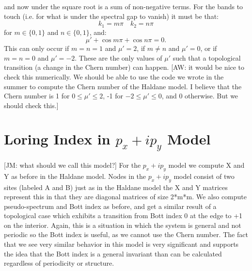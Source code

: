 \documentclass[a4paper]{article}
\newcommand{\aw}[1]{{\color{blue} [AW: #1]}}
\newcommand{\jm}[1]{{\color{red} [JM: #1]}}
\begin{document}
and now under the square root is a sum of non-negative terms. For the bands to touch (i.e. for what is under the spectral gap to vanish) it must be that:
\begin{equation}
	k_1 = m \pi \quad k_2 = n \pi
\end{equation}
for $m \in \{0,1\}$ and $n \in \{0,1\}$, and:
\begin{equation}
	\mu' + \cos m \pi + \cos n \pi = 0.
\end{equation}
This can only occur if $m = n = 1$ and $\mu' = 2$, if $m \neq n$ and $\mu' = 0$, or if $m = n = 0$ and $\mu' = - 2$. These are the only values of $\mu'$ such that a topological transition (a change in the Chern number) can happen. \aw{it would be nice to check this numerically. We should be able to use the code we wrote in the summer to compute the Chern number of the Haldane model. I believe that the Chern number is 1 for $0 \leq \mu' \leq 2$, -1 for $- 2 \leq \mu' \leq 0$, and 0 otherwise. But we should check this.}

\section{Loring Index in \texorpdfstring{$p_x + ip_y$}{px + ipy} Model}
\jm{what should we call this model?}
For the \texorpdfstring{$p_x + ip_y$}{px + ipy} model we compute X and Y as before in the Haldane model. Nodes in the \texorpdfstring{$p_x + ip_y$}{px + ipy} model consist of two sites (labeled A and B) just as in the Haldane model the X and Y matrices represent this in that they are diagonal matrices of size 2*m*m. We also compute pseudo-spectrum and Bott index as before, and get a similar result of a topological case which exhibits a transition from Bott index 0 at the edge to +1 on the interior. Again, this is a situation in which the system is general and not periodic so the Bott index is useful, as we cannot use the Chern number. The fact that we see very similar behavior in this model is very significant and supports the idea that the Bott index is a general invariant than can be calculated regardless of periodicity or structure.
\end{document}
